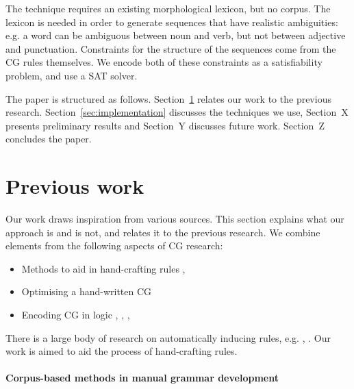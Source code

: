 The technique requires an existing morphological lexicon, but no corpus. 
The lexicon is needed in order to generate sequences that have realistic ambiguities: e.g. a word can be ambiguous between noun and verb, but not between adjective and punctuation. 
Constraints for the structure of the sequences come from the CG rules themselves.
We encode both of these constraints as a satisfiability problem, and use a SAT solver.

The paper is structured as follows. Section~\ref{sec:prev} relates our work to the previous research. Section~\ref{sec:implementation} discusses the techniques we use, Section~X presents preliminary results and  Section~Y discusses future work. Section~Z concludes the paper.






\section{Previous work}
\label{sec:prev}

Our work draws inspiration from various sources. This section explains what our approach is and is not, and relates it to the previous research. We combine elements from the following aspects of CG research:

\begin{itemize}
\item Methods to aid in hand-crafting rules \cite{voutilainen2004}, \cite{tyers_reynolds2015}
\item Optimising a hand-written CG \cite{bick2013tuning}
\item Encoding CG in logic \cite{lager98}, \cite{lager_nivre01}, \cite{lager01transformation}, \cite{listenmaa_claessen2015}
\end{itemize}

There is a large body of research on automatically inducing rules, e.g. \cite{inducing_cg1996}, \cite{lindberg_eineborg98ilp}%
. Our work is aimed to aid the process of hand-crafting rules.

\paragraph{Corpus-based methods in manual grammar development}

